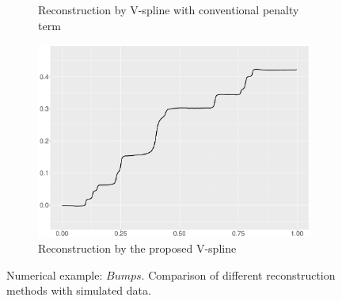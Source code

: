 \begin{figure}
\begin{subfigure}{0.45\textwidth}
    \caption{Reconstruction by V-spline with conventional penalty term}
    \end{subfigure}
    \begin{subfigure}{0.45\textwidth}
    \centering
    \includegraphics[width=\linewidth,height=0.45\textwidth]{Chapters/02TractorSplineTheory/plot/ggplot/ggBumpsTractor.pdf}
    \caption{Reconstruction by the proposed V-spline}
    \end{subfigure}
\caption{Numerical example: $\textit{Bumps}$. Comparison of different reconstruction methods with simulated data.}\label{num2}
 \end{figure}


